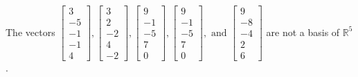 \begin{exercise}
\begin{exerciseStatement}
  \end{exerciseStatement}
  \begin{exerciseAnswer}
   The vectors \(\left[\begin{array}{r}
3 \\
-5 \\
-1 \\
-1 \\
4
\end{array}\right] , \left[\begin{array}{r}
3 \\
2 \\
-2 \\
4 \\
-2
\end{array}\right] , \left[\begin{array}{r}
9 \\
-1 \\
-5 \\
7 \\
0
\end{array}\right] , \left[\begin{array}{r}
9 \\
-1 \\
-5 \\
7 \\
0
\end{array}\right] , \text{ and } \left[\begin{array}{r}
9 \\
-8 \\
-4 \\
2 \\
6
\end{array}\right]\) 
  	 are not  a basis of \(\mathbb{R}^5\).
  


  \end{exerciseAnswer}
\end{exercise}